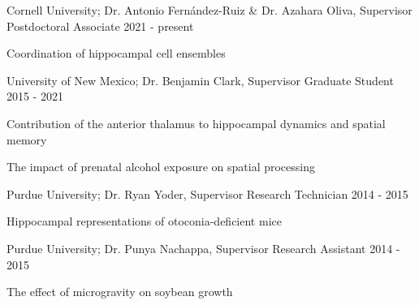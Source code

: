 

\begin{cventries}

  \cventry
    {Cornell University; Dr. Antonio Fern\'{a}ndez-Ruiz \& Dr. Azahara Oliva, Supervisor} %
    {Postdoctoral Associate} %
    {} %
    {2021 - present} %
    {
      \begin{cvitems} %
        \item {Coordination of hippocampal cell ensembles}
      \end{cvitems}
    }
    
  \cventry
    {University of New Mexico; Dr. Benjamin Clark, Supervisor} %
    {Graduate Student} %
    {} %
    {2015 - 2021} %
    {
      \begin{cvitems} %
        \item {Contribution of the anterior thalamus to hippocampal dynamics and spatial memory}
        \item {The impact of prenatal alcohol exposure on spatial processing}
      \end{cvitems}
    }

  \cventry
    {Purdue University; Dr. Ryan Yoder, Supervisor} %
    {Research Technician} %
    {} %
    {2014 - 2015} %
    {
      \begin{cvitems} %
        \item {Hippocampal representations of otoconia-deficient mice}
      \end{cvitems}
    }
    
   \cventry
    {Purdue University; Dr. Punya Nachappa, Supervisor} %
    {Research Assistant} %
    {} %
    {2014 - 2015} %
    {
      \begin{cvitems} %
        \item {The effect of microgravity on soybean growth}
      \end{cvitems}
    }
    

\end{cventries}
